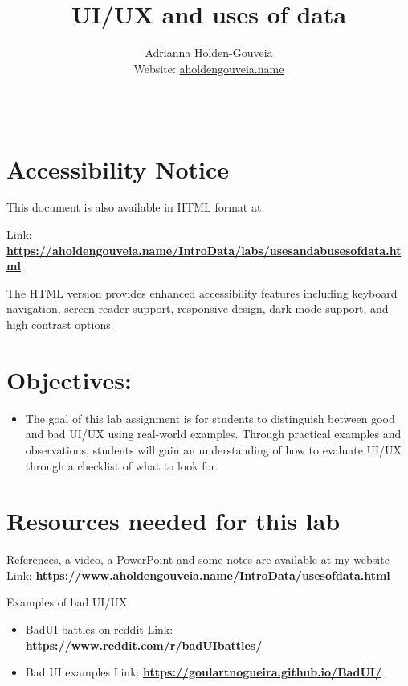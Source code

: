 \documentclass[12pt]{article}
\title{UI/UX and uses of data}
\author{
        Adrianna Holden-Gouveia \\
        Website: \href{https://aholdengouveia.name}{aholdengouveia.name}\\ 
        \date{\vspace{-5ex}}
        \faGithub {: aholdengouveia} \\
        }
\begin{document}
    

\maketitle



\section*{Accessibility Notice}
This document is also available in HTML format at:

Link: \href{https://aholdengouveia.name/IntroData/labs/usesandabusesofdata.html}{\textbf{https://aholdengouveia.name/IntroData/labs/usesandabusesofdata.html}}

The HTML version provides enhanced accessibility features including keyboard navigation, screen reader support, responsive design, dark mode support, and high contrast options.

\section*{Objectives:}
\begin{itemize}
    \item The goal of this lab assignment is for students to distinguish between good and bad UI/UX using real-world examples. Through practical examples and observations, students will gain an understanding of how to evaluate UI/UX through a checklist of what to look for.
\end{itemize}


\section*{Resources needed for this lab}

References, a video, a PowerPoint and some notes are available at my website
Link: \href{https://www.aholdengouveia.name/IntroData/usesofdata.html}{\textbf{https://www.aholdengouveia.name/IntroData/usesofdata.html}}

Examples of bad UI/UX
\begin{itemize}
    \item BadUI battles on reddit Link: \href{https://www.reddit.com/r/badUIbattles/}{\textbf{https://www.reddit.com/r/badUIbattles/}}
    \item Bad UI examples Link: \href{https://goulartnogueira.github.io/BadUI/}{\textbf{https://goulartnogueira.github.io/BadUI/}}
\end{itemize}    
\end{document}
